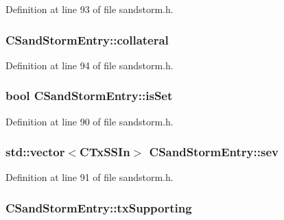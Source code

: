 Definition at line 93 of file sandstorm.\+h.

\hypertarget{class_c_sand_storm_entry_a184e3999700add47aa0fa6d7968d8264}{}
\subsubsection[{collateral}]{ C\+Sand\+Storm\+Entry\+::collateral}\label{class_c_sand_storm_entry_a184e3999700add47aa0fa6d7968d8264}


Definition at line 94 of file sandstorm.\+h.

\hypertarget{class_c_sand_storm_entry_ad6a36c4a905189729bb33d4b9a4793a2}{}
\subsubsection[{is\+Set}]{\setlength{\rightskip}{0pt plus 5cm}bool C\+Sand\+Storm\+Entry\+::is\+Set}\label{class_c_sand_storm_entry_ad6a36c4a905189729bb33d4b9a4793a2}


Definition at line 90 of file sandstorm.\+h.

\hypertarget{class_c_sand_storm_entry_abad515f03d3c6a1caea06ac0582d46f5}{}
\subsubsection[{sev}]{\setlength{\rightskip}{0pt plus 5cm}std\+::vector$<${\bf C\+Tx\+S\+S\+In}$>$ C\+Sand\+Storm\+Entry\+::sev}\label{class_c_sand_storm_entry_abad515f03d3c6a1caea06ac0582d46f5}


Definition at line 91 of file sandstorm.\+h.

\hypertarget{class_c_sand_storm_entry_a85966c7316ba0642a58189e23f49daf5}{}
\subsubsection[{tx\+Supporting}]{ C\+Sand\+Storm\+Entry\+::tx\+Supporting}\label{class_c_sand_storm_entry_a85966c7316ba0642a58189e23f49daf5}


